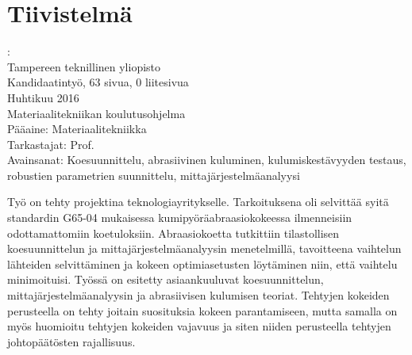 \documentclass[12pt,a4paper,finnish]{tutthesis}
\begin{document}



\chapter*{Tiivistelmä}         %

\begin{spacing}{1.0}
         {\bf \textsf{\MakeUppercase{\@author}}}: \@title\\  %
         \textsf{Tampereen teknillinen yliopisto}\\
         \textsf{Kandidaatintyö, 63 sivua, 0 liitesivua}\\ %
         \textsf{Huhtikuu 2016}\\
         \textsf{Materiaalitekniikan koulutusohjelma}\\
         \textsf{Pääaine: Materiaalitekniikka}\\
         \textsf{Tarkastajat:  Prof. \@examiner}\\ %
         \textsf{Avainsanat: Koesuunnittelu, abrasiivinen kuluminen, kulumiskestävyyden testaus, robustien parametrien suunnittelu, mittajärjestelmäanalyysi}\\
\end{spacing}





Työ on tehty projektina teknologiayritykselle. Tarkoituksena oli selvittää syitä standardin
G65-04 mukaisessa kumipyöräabraasiokokeessa ilmenneisiin odottamattomiin koetuloksiin.
Abraasiokoetta tutkittiin tilastollisen koesuunnittelun ja mittajärjestelmäanalyysin
menetelmillä, tavoitteena vaihtelun lähteiden selvittäminen ja kokeen optimiasetusten
löytäminen niin, että vaihtelu minimoituisi. Työssä on esitetty asiaankuuluvat
koesuunnittelun, mittajärjestelmäanalyysin ja abrasiivisen kulumisen teoriat.
Tehtyjen kokeiden perusteella on tehty joitain suosituksia kokeen parantamiseen, mutta
samalla on myös huomioitu tehtyjen kokeiden vajavuus ja siten niiden
perusteella tehtyjen johtopäätösten rajallisuus.
\end{document}
